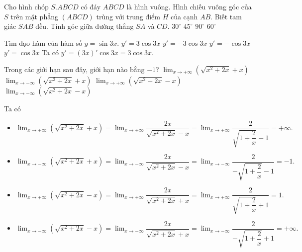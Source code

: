 \begin{ex}%
	Cho hình chóp $S.ABCD$ có đáy $ABCD$ là hình vuông. Hình chiếu vuông góc của $S$ trên mặt phẳng $(ABCD)$ trùng với trung điểm $H$ của cạnh $AB$. Biết tam giác $SAB$ đều. Tính góc giữa đường thẳng $SA$ và $CD$.
	\choice
	{$30^\circ$}
	{$45^\circ$}
	{$90^\circ$}
	{\True $60^\circ$}
\end{ex}

\begin{ex}%
	Tìm đạo hàm của hàm số $y=\sin3x$.
	\choice
	{\True $y'=3\cos3x$}
	{$y'=-3\cos3x$}
	{$y'=-\cos3x$}
	{$y'=\cos3x$}
	\loigiai
	{Ta có $y'=(3x)'\cos3x=3\cos3x.$}
\end{ex}

\begin{ex}%
	Trong các giới hạn sau đây, giới hạn nào bằng $-1$?
	\choice
	{$\displaystyle\lim_{x \to +\infty}\left(\sqrt{x^2+2x}+x\right)$}
	{\True $\displaystyle\lim_{x \to -\infty}\left(\sqrt{x^2+2x}+x\right)$}
	{$\displaystyle\lim_{x \to +\infty}\left(\sqrt{x^2+2x}-x\right)$}
	{$\displaystyle\lim_{x \to -\infty}\left(\sqrt{x^2+2x}-x\right)$}
	\loigiai
	{Ta có 
		\begin{itemize}
			\item $\displaystyle\lim_{x \to +\infty}\left(\sqrt{x^2+2x}+x\right)=\displaystyle\lim_{x \to +\infty}\dfrac{2x}{\sqrt{x^2+2x}-x}=\displaystyle\lim_{x \to +\infty}\dfrac{2}{\sqrt{1+\dfrac{2}{x}}-1}=+\infty.$
			\item $\displaystyle\lim_{x \to -\infty}\left(\sqrt{x^2+2x}+x\right)=\displaystyle\lim_{x \to -\infty}\dfrac{2x}{\sqrt{x^2+2x}-x}=\displaystyle\lim_{x \to -\infty}\dfrac{2}{-\sqrt{1+\dfrac{2}{x}}-1}=-1.$
			\item $\displaystyle\lim_{x \to +\infty}\left(\sqrt{x^2+2x}-x\right)=\displaystyle\lim_{x \to +\infty}\dfrac{2x}{\sqrt{x^2+2x}+x}=\displaystyle\lim_{x \to +\infty}\dfrac{2}{\sqrt{1+\dfrac{2}{x}}+1}=1.$
			\item $\displaystyle\lim_{x \to -\infty}\left(\sqrt{x^2+2x}-x\right)=\displaystyle\lim_{x \to -\infty}\dfrac{2x}{\sqrt{x^2+2x}+x}=\displaystyle\lim_{x \to -\infty}\dfrac{2}{-\sqrt{1+\dfrac{2}{x}}+1}=+\infty.$
		\end{itemize}
	}
\end{ex}

